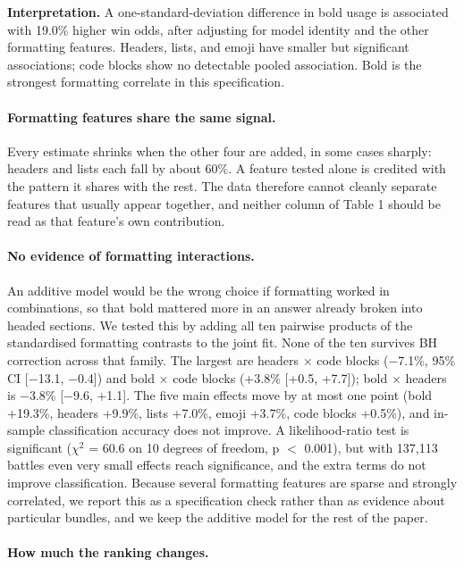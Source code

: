\documentclass[
]{article}
\begin{document}
\textbf{Interpretation.} A one-standard-deviation difference in bold
usage is associated with 19.0\% higher win odds, after adjusting for
model identity and the other formatting features. Headers, lists, and
emoji have smaller but significant associations; code blocks show no
detectable pooled association. Bold is the strongest formatting
correlate in this specification.

\paragraph{Formatting features share the same signal.}\label{formatting-features-share-the-same-signal}

Every estimate shrinks when the other four are added, in some cases
sharply: headers and lists each fall by about 60\%. A feature tested
alone is credited with the pattern it shares with the rest. The data
therefore cannot cleanly separate features that usually appear together,
and neither column of Table 1 should be read as that feature's own
contribution.

\paragraph{No evidence of formatting interactions.}\label{formatting-interactions}

An additive model would be the wrong choice if formatting worked in
combinations, so that bold mattered more in an answer already broken
into headed sections. We tested this by adding all ten pairwise products
of the standardised formatting contrasts to the joint fit. None of the
ten survives BH correction across that family. The largest are headers ×
code blocks (−7.1\%, 95\% CI {[}−13.1, −0.4{]}) and bold × code blocks
(+3.8\% {[}+0.5, +7.7{]}); bold × headers is −3.8\% {[}−9.6, +1.1{]}.
The five main effects move by at most one point (bold +19.3\%, headers
+9.9\%, lists +7.0\%, emoji +3.7\%, code blocks +0.5\%), and in-sample
classification accuracy does not improve. A likelihood-ratio test is
significant (\(\chi^2\) = 60.6 on 10 degrees of freedom, p \(<\) 0.001),
but with 137,113 battles even very small effects reach significance, and
the extra terms do not improve classification. Because several formatting features are sparse
and strongly correlated, we report this as a specification check rather
than as evidence about particular bundles, and we keep the additive
model for the rest of the paper.

\paragraph{How much the ranking changes.}\label{how-much-the-ranking-changes}
\end{document}

